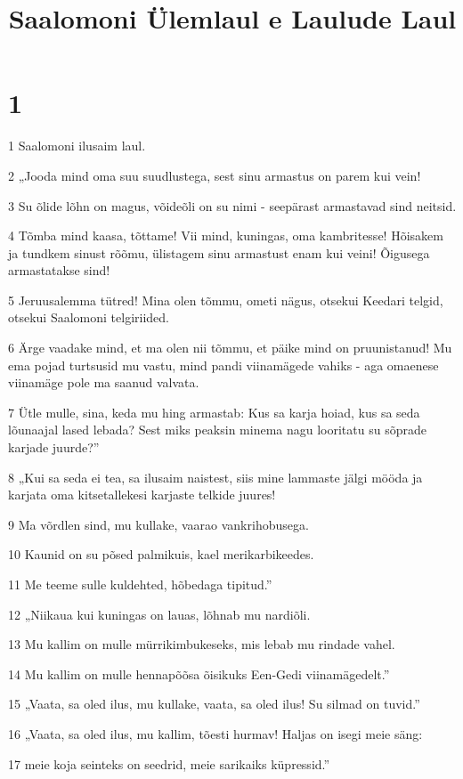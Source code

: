 

\title{Saalomoni Ülemlaul e Laulude Laul}

\chapter{1}

\par 1 Saalomoni ilusaim laul.
\par 2 „Jooda mind oma suu suudlustega, sest sinu armastus on parem kui vein!
\par 3 Su õlide lõhn on magus, võideõli on su nimi - seepärast armastavad sind neitsid.
\par 4 Tõmba mind kaasa, tõttame! Vii mind, kuningas, oma kambritesse! Hõisakem ja tundkem sinust rõõmu, ülistagem sinu armastust enam kui veini! Õigusega armastatakse sind!
\par 5 Jeruusalemma tütred! Mina olen tõmmu, ometi nägus, otsekui Keedari telgid, otsekui Saalomoni telgiriided.
\par 6 Ärge vaadake mind, et ma olen nii tõmmu, et päike mind on pruunistanud! Mu ema pojad turtsusid mu vastu, mind pandi viinamägede vahiks - aga omaenese viinamäge pole ma saanud valvata.
\par 7 Ütle mulle, sina, keda mu hing armastab: Kus sa karja hoiad, kus sa seda lõunaajal lased lebada? Sest miks peaksin minema nagu looritatu su sõprade karjade juurde?”
\par 8 „Kui sa seda ei tea, sa ilusaim naistest, siis mine lammaste jälgi mööda ja karjata oma kitsetallekesi karjaste telkide juures!
\par 9 Ma võrdlen sind, mu kullake, vaarao vankrihobusega.
\par 10 Kaunid on su põsed palmikuis, kael merikarbikeedes.
\par 11 Me teeme sulle kuldehted, hõbedaga tipitud.”
\par 12 „Niikaua kui kuningas on lauas, lõhnab mu nardiõli.
\par 13 Mu kallim on mulle mürrikimbukeseks, mis lebab mu rindade vahel.
\par 14 Mu kallim on mulle hennapõõsa õisikuks Een-Gedi viinamägedelt.”
\par 15 „Vaata, sa oled ilus, mu kullake, vaata, sa oled ilus! Su silmad on tuvid.”
\par 16 „Vaata, sa oled ilus, mu kallim, tõesti hurmav! Haljas on isegi meie säng:
\par 17 meie koja seinteks on seedrid, meie sarikaiks küpressid.”

